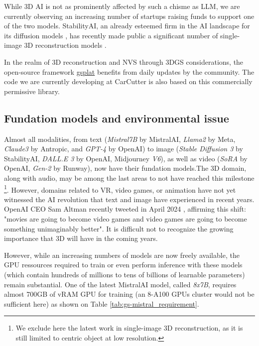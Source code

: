 While 3D \ac{AI} is not as prominently affected by such a chisme as \ac{LLM}, we are currently observing an increasing number of startups raising funds to support one of the two models. StabilityAI, an already esteemed firm in the \ac{AI} landscape for its diffusion models \citep{esser2024scaling}, has recently made public a significant number of single-image 3D reconstruction models \citep{tochilkin2024triposr,voleti2024sv3d}. 

In the realm of 3D reconstruction and \ac{NVS} through 3D\ac{GS} considerations, the open-source framework \href{https://docs.gsplat.studio/main/}{gsplat} benefits from daily updates by the community. The code we are currently developing at CarCutter is also based on this commercially permissive library. 

\subsection{Fundation models and environmental issue}

Almost all modalities, from text (\textit{Mistral7B} by MistralAI, \textit{Llama2} by Meta, \textit{Claude3} by Antropic, and \textit{GPT-4} by OpenAI) to image (\textit{Stable Diffusion 3} by StabilityAI, \textit{DALL.E 3} by OpenAI, Midjourney \textit{V6}), as well as video (\textit{SoRA} by OpenAI, \textit{Gen-2} by Runway), now have their fundation models.The 3D domain, along with audio, may be among the last areas to not have reached this milestone \footnote{We exclude here the latest work in single-image 3D reconstruction, as it is still limited to centric object at low resolution.}. However, domains related to \ac{VR}, video games, or animation have not yet witnessed the \ac{AI} revolution that text and image have experienced in recent years. OpenAI CEO Sam Altman recently tweeted in April 2024 , affirming this shift: "movies are going to become video games and video games are going to become something unimaginably better". It is difficult not to recognize the growing importance that 3D will have in the coming years.

However, while an increasing numbers of models are now freely available, the \ac{GPU} ressources required to train or even perform inference with these models (which contain hundreds of millions to tens of billions of learnable parameters) remain substantial. One of the latest MistralAI model, called \textit{8x7B}, requires almost 700GB of vRAM \ac{GPU} for training (an 8-A100 \ac{GPU}s cluster would not be sufficient here) as shown on Table \ref{tab:gs-mistral_requirement}. 

